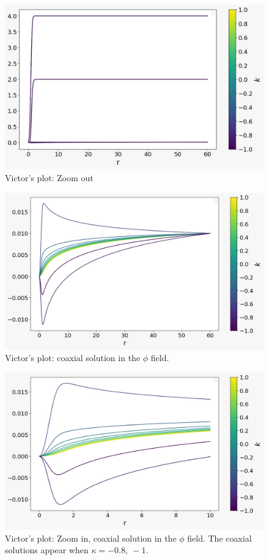 \documentclass[10pt,a4paper]{article}
\begin{document}
\begin{figure}
	\includegraphics[scale=0.3]{coaxial1.jpeg}
	\caption{Victor's plot: Zoom out}
\end{figure}

\begin{figure}
	\includegraphics[scale=0.3]{coaxial2.jpeg}
	\caption{Victor's plot: coaxial solution in the $\phi$ field.}
\end{figure}
\begin{figure}
	\includegraphics[scale=0.3]{coaxial3.jpeg}
		\caption{Victor's plot: Zoom in, coaxial solution in the $\phi$ field. The coaxial solutions appear when $\kappa = -0.8,\ -1$.}
\end{figure}
\end{document}
